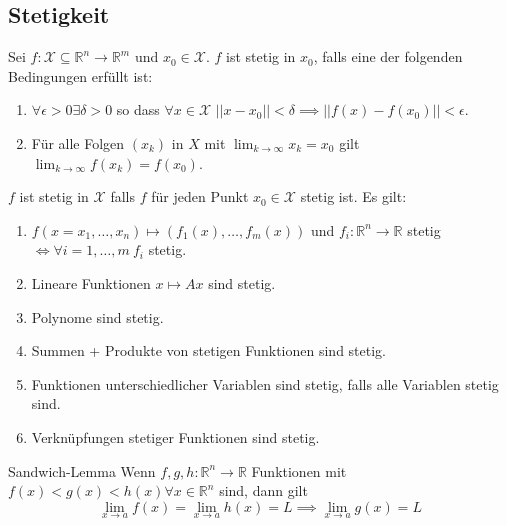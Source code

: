 \documentclass[a4paper,10pt]{article}
\def\R{\mathbb{R}}
\def\X{\mathcal{X}}
\begin{document}
\subsection{Stetigkeit}
Sei \(f: \X \subseteq \R^n \to \R^m\)  und \(x_0 \in \X\). \(f\) ist stetig in \(x_0\), falls eine der folgenden Bedingungen erfüllt ist:
\begin{enumerate}
  \item \(\forall \epsilon > 0 \exists \delta > 0\) so dass \(\forall x \in \X \) \(||x - x_0|| < \delta \implies ||f(x) - f(x_0)|| < \epsilon\).
  \item Für alle Folgen \((x_k)\) in \(X\) mit \(\lim_{k \to \infty} x_k = x_0\) gilt \(\lim_{k \to \infty} f(x_k) = f(x_0)\).
\end{enumerate}
\(f\) ist stetig in \(\X\) falls \(f\) für jeden Punkt \(x_0 \in \X\) stetig ist. Es gilt:
\begin{enumerate}
  \item \(f(x = x_1, \ldots, x_n) \mapsto (f_1(x),\ldots,f_m(x))\) und \(f_i: \R^n \to \R\) stetig \(\iff \forall i = 1, \ldots, m \ f_i\) stetig.
  \item Lineare Funktionen \(x \mapsto Ax\) sind stetig.
  \item Polynome sind stetig.
  \item Summen + Produkte von stetigen Funktionen sind stetig.
  \item Funktionen unterschiedlicher Variablen sind stetig, falls alle Variablen stetig sind.
  \item Verknüpfungen stetiger Funktionen sind stetig.
\end{enumerate}
\begin{mainbox}{Sandwich-Lemma}
  Wenn \(f, g, h: \R^n \to \R\) Funktionen mit \(f(x) < g(x) < h(x) \forall x \in \R^n\) sind, dann gilt
  \[\lim_{x\to a} f(x) = \lim_{x \to a} h(x) = L \implies \lim_{x\to a} g(x) = L\]
\end{mainbox}
\end{document}
